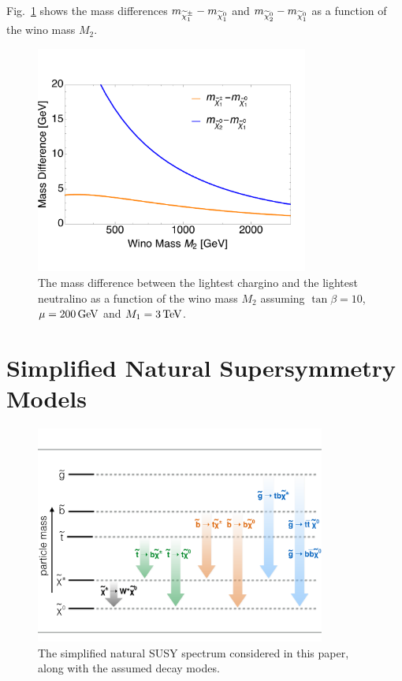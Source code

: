 Fig.~\ref{fig:neutralinos} shows the mass differences
$m_{\widetilde{\chi}^{\pm}_1}-m_{\widetilde{\chi}^{0}_1}$ and $m_{\widetilde{\chi}^{0}_2}-m_{\widetilde{\chi}^{0}_1}$ as a function of the wino mass $M_2$.


\begin{figure}[tb!]
\centering
\includegraphics[width=0.8\textwidth,clip=true,viewport= 0 30 610 450]{figs/theory/neutralinos.pdf}
\caption{The mass difference between the lightest chargino and the
  lightest neutralino as a function of the wino mass $M_2$
  assuming $\tan\beta=10$, $\mu=200 \,\text{Ge\hspace{-.08em}V}$ and $M_1 = 3 \,\text{Te\hspace{-.08em}V}$.\label{fig:neutralinos}}
\end{figure}

\section{Simplified Natural Supersymmetry Models}
\label{sec:sms}

\begin{figure}[htb!]
\centering
\includegraphics[width=0.85\textwidth]{figs/analysis8TeV/naturalSpectrum.pdf}
\caption{\label{fig:spectrum} The simplified natural SUSY spectrum
  considered in this paper, along with the assumed decay modes.}
\end{figure}

